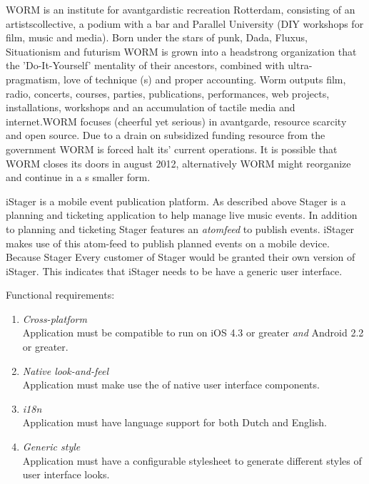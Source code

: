 WORM is an institute for avantgardistic recreation Rotterdam, consisting of an artistscollective, a podium with a bar and Parallel University (DIY workshops for film, music and media). Born under the stars of punk, Dada, Fluxus, Situationism and futurism WORM is grown into a headstrong organization that the 'Do-It-Yourself' mentality of their ancestors, combined with ultra-pragmatism, love of technique (s) and proper accounting. Worm outputs film, radio, concerts, courses, parties, publications, performances, web projects, installations, workshops and an accumulation of tactile media and internet.WORM focuses (cheerful yet serious) in avantgarde, resource scarcity and open source. \cite{WORM2012} Due to a drain on subsidized funding resource from the government WORM is forced halt its' current operations. It is possible that WORM closes its doors in august 2012, alternatively WORM might reorganize and continue in a s smaller form.

iStager is a mobile event publication platform. As described above Stager is a planning and ticketing application to help manage live music events. In addition to planning and ticketing Stager features an \emph{atomfeed} to publish events. iStager makes use of this atom-feed to publish planned events on a mobile device. Because Stager
Every customer of Stager would be granted their own version of iStager. This indicates that iStager needs to be have a generic user interface.



Functional requirements:
\begin{enumerate}
\item \emph{Cross-platform}\\Application must be compatible to run on iOS 4.3 or greater \emph{and} Android 2.2 or greater.
\item \emph{Native look-and-feel}\\Application must make use the of native user interface components.
\item \emph{i18n}\\Application must have language support for both Dutch and English.
\item \emph{Generic style}\\Application must have a configurable stylesheet to generate different styles of user interface looks.
\end{enumerate}


